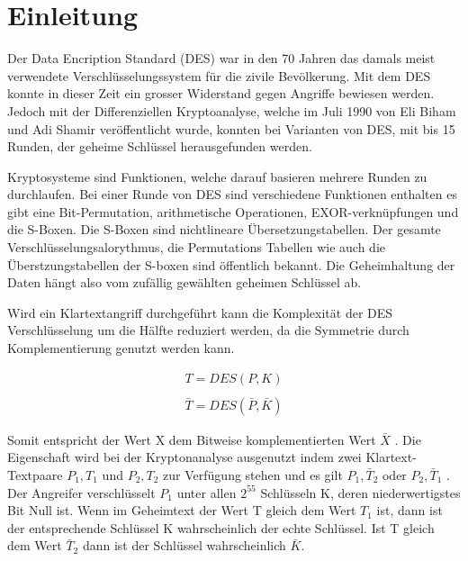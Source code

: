 \clearpage
\section{Einleitung}\label{sec:Einleitung}
Der Data Encription Standard (DES) war in den 70 Jahren das damals meist verwendete Verschlüsselungssystem für die zivile Bevölkerung. Mit dem DES konnte in dieser Zeit ein grosser Widerstand gegen Angriffe bewiesen werden. Jedoch mit der Differenziellen Kryptoanalyse, welche im Juli 1990 von Eli Biham und Adi Shamir veröffentlicht wurde, konnten bei Varianten von DES, mit bis 15 Runden, der geheime Schlüssel herausgefunden werden. 

Kryptosysteme sind Funktionen, welche darauf basieren mehrere Runden zu durchlaufen. Bei einer Runde von DES sind verschiedene Funktionen enthalten es gibt eine Bit-Permutation, arithmetische Operationen, EXOR-verknüpfungen und die S-Boxen. Die S-Boxen sind nichtlineare Übersetzungstabellen. Der gesamte Verschlüsselungsalorythmus, die Permutations Tabellen wie auch die Überstzungstabellen der S-boxen sind öffentlich bekannt. Die Geheimhaltung der Daten hängt also vom zufällig gewählten geheimen Schlüssel ab. 

 Wird ein Klartextangriff durchgeführt kann die Komplexität der DES Verschlüsselung um die Hälfte reduziert werden, da die Symmetrie durch Komplementierung genutzt werden kann.
 
 \begin{eqnarray*}
 T=DES(P,K)\\
 \\
  \bar{T}=DES(\bar{P},\bar{K})
 \end{eqnarray*}
 
 Somit entspricht der Wert X dem Bitweise komplementierten Wert $\bar{X}$ . Die Eigenschaft wird bei der Kryptonanalyse ausgenutzt indem zwei Klartext-Textpaare $P_{1} ,T_{1}$ und $P_{2} ,T_{2}$ zur Verfügung stehen und es gilt ${P}_{1} ,\bar{T}_{2}$ oder ${P}_{2} ,\bar{T}_{1}$ . Der Angreifer verschlüsselt $P_{1}$ unter allen $2^{55}$ Schlüsseln K, deren niederwertigstes Bit Null ist. Wenn im Geheimtext der Wert T gleich dem Wert $T_{1}$ ist, dann ist der entsprechende Schlüssel K wahrscheinlich der echte Schlüssel. Ist T gleich dem Wert $\bar{T}_{2}$ dann ist der Schlüssel wahrscheinlich $\bar{K}$. 






